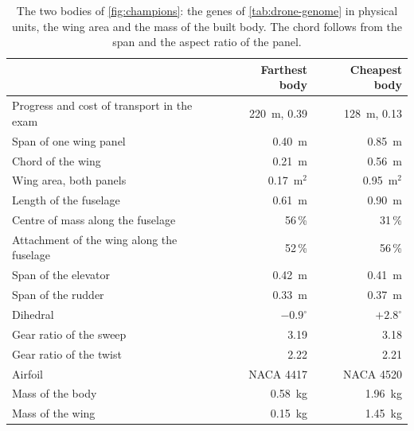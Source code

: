 \begin{table}[htbp]
\centering
\begin{tabularx}{\textwidth}{>{\raggedright\arraybackslash}X r r}
\hline
 & Farthest body & Cheapest body \\
\hline
Progress and cost of transport in the exam & 220~m, 0.39 & 128~m, 0.13 \\
Span of one wing panel & 0.40~m & 0.85~m \\
Chord of the wing & 0.21~m & 0.56~m \\
Wing area, both panels & 0.17~m$^2$ & 0.95~m$^2$ \\
Length of the fuselage & 0.61~m & 0.90~m \\
Centre of mass along the fuselage & 56\,\% & 31\,\% \\
Attachment of the wing along the fuselage & 52\,\% & 56\,\% \\
Span of the elevator & 0.42~m & 0.41~m \\
Span of the rudder & 0.33~m & 0.37~m \\
Dihedral & $-0.9^{\circ}$ & $+2.8^{\circ}$ \\
Gear ratio of the sweep & 3.19 & 3.18 \\
Gear ratio of the twist & 2.22 & 2.21 \\
Airfoil & NACA 4417 & NACA 4520 \\
Mass of the body & 0.58~kg & 1.96~kg \\
Mass of the wing & 0.15~kg & 1.45~kg \\
\hline
\end{tabularx}
\caption[The two bodies at the ends of the front of a co-design run]{The two bodies of \autoref{fig:champions}: the genes of \autoref{tab:drone-genome} in physical units, the wing area and the mass of the built body. The chord follows from the span and the aspect ratio of the panel.}
\label{tab:champions}
\end{table}

